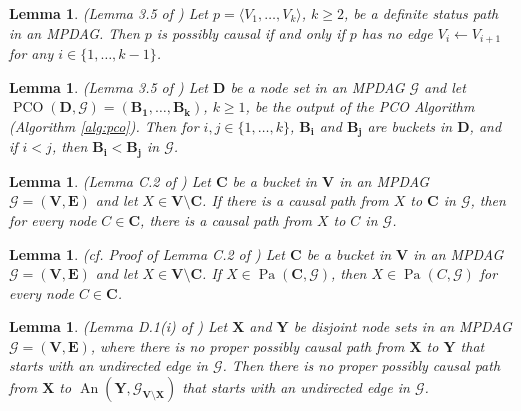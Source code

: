 \documentclass[11pt]{article}
\DeclareMathOperator{\An}{An}
\DeclareMathOperator{\Pa}{Pa}
\DeclareMathOperator{\PCO}{PCO}
\newtheorem{lemma}[theorem]{Lemma}
\newcommand{\mb}[1]{\mathbf{#1}}
\newcommand{\g}[1][G]{\mathcal{#1}}
\begin{document}
\begin{lemma}
\label{lem:pc-def-stat}
{\normalfont (Lemma 3.5 of \citealp{perkovic2017interpreting})}
    Let $p = \langle V_1, \dots, V_k \rangle$, $k \ge 2$, be a definite status path in an MPDAG. Then $p$ is possibly causal if and only if $p$ has no edge $V_i \gets V_{i+1}$ for any $i \in \{1, \dots, k-1\}$. 
\end{lemma}


\begin{lemma}
\label{lem:PCO-buckets}
{\normalfont (Lemma 3.5 of \citealp{perkovic2020identifying})}
    Let $\mb{D}$ be a node set in an MPDAG $\g$ and let $\PCO(\mb{D}, \g)=(\mb{B_1}, \dots, \mb{B_k})$, $k \ge 1$, be the output of the PCO Algorithm (Algorithm \ref{alg:pco}). Then for $i,j \in \{1, \dots, k\}$, $\mb{B_i}$ and $\mb{B_j}$ are buckets in $\mb{D}$, and if $i < j$, then $\mb{B_i} < \mb{B_j}$ in $\g$. 
\end{lemma}


\begin{lemma}
\label{lem:bucket-req1}
{\normalfont (Lemma C.2 of \citealp{perkovic2020identifying})}
    Let $\mb{C}$ be a bucket in $\mb{V}$ in an MPDAG $\g = (\mb{V},\mb{E})$ and let $X \in \mb{V} \setminus \mb{C}$. If there is a causal path from $X$ to $\mb{C}$ in $\g$, then for every node $C \in \mb{C}$, there is a causal path from $X$ to $C$ in $\g$.
\end{lemma}


\begin{lemma}
\label{lem:bucket-req2}
{\normalfont (cf. Proof of Lemma C.2 of \citealp{perkovic2020identifying})}
    Let $\mb{C}$ be a bucket in $\mb{V}$ in an MPDAG $\g = (\mb{V},\mb{E})$ and let $X \in \mb{V} \setminus \mb{C}$. If $X \in \Pa(\mb{C}, \g)$, then $X \in \Pa(C, \g)$ for every node $C \in \mb{C}$.
\end{lemma}


\begin{lemma}
\label{lem:xtod}
{\normalfont (Lemma D.1(i) of \citealp{perkovic2020identifying})}
    Let $\mb{X}$ and $\mb{Y}$ be disjoint node sets in an MPDAG $\g =(\mb{V,E})$, where there is no proper possibly causal path from $\mb{X}$ to $\mb{Y}$ that starts with an undirected edge in $\g$. Then there is no proper possibly causal path from $\mb{X}$ to $\An(\mb{Y},\g_{\mb{V} \setminus \mb{X}})$ that starts with an undirected edge in $\g$.
\end{lemma}
\end{document}
